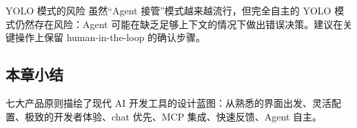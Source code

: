 \begin{warningbox}{YOLO 模式的风险}
虽然``Agent 接管''模式越来越流行，但完全自主的 YOLO 模式仍然存在风险：Agent 可能在缺乏足够上下文的情况下做出错误决策。建议在关键操作上保留 human-in-the-loop 的确认步骤。
\end{warningbox}

\subsection{本章小结}

七大产品原则描绘了现代 AI 开发工具的设计蓝图：从熟悉的界面出发、灵活配置、极致的开发者体验、chat 优先、MCP 集成、快速反馈、Agent 自主。

